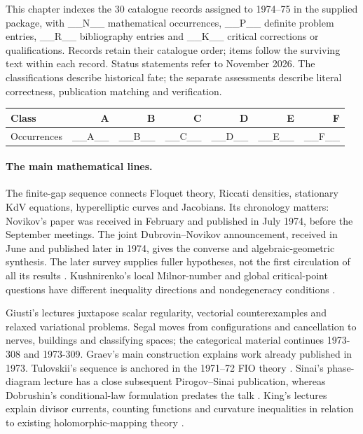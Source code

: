 \noindent
This chapter indexes the 30 catalogue records assigned to 1974--75 in the supplied
package, with __N__ mathematical occurrences, __P__ definite problem entries,
__R__ bibliography entries and __K__ critical corrections or qualifications.
Records retain their catalogue order; items follow the surviving text within
each record. Status statements refer to November 2026. The classifications
describe historical fate; the separate assessments describe literal correctness,
publication matching and verification.

\begin{center}
\begin{tabular}{@{}lrrrrrr@{}}
\toprule
Class & A & B & C & D & E & F\\
\midrule
Occurrences & __A__ & __B__ & __C__ & __D__ & __E__ & __F__\\
\bottomrule
\end{tabular}
\end{center}

\paragraph{The main mathematical lines.}
The finite-gap sequence connects Floquet theory, Riccati densities, stationary
KdV equations, hyperelliptic curves and Jacobians. Its chronology matters:
Novikov's paper was received in February and published in July 1974, before
the September meetings. The joint Dubrovin--Novikov announcement, received in
June and published later in 1974, gives the converse and algebraic-geometric
synthesis. The later survey supplies fuller hypotheses, not the first
circulation of all its results
\citep{novikov1974periodic,dubrovinnovikov1974periodicity,dubrovinmatveevnovikov1976nonlinear}.
Kushnirenko's local Milnor-number and global critical-point questions have
different inequality directions and nondegeneracy conditions
\citep[Theorems I--II]{kushnirenko1975newton}.

Giusti's lectures juxtapose scalar regularity, vectorial counterexamples and
relaxed variational problems. Segal moves from configurations and cancellation
to nerves, buildings and classifying spaces; the categorical material continues
1973-308 and 1973-309. Graev's main construction explains work already published
in 1973. Tulovskii's sequence is anchored in the 1971--72 FIO theory
\citep{hormander1971fourier,duistermaathormander1972fourierii}.
Sinai's phase-diagram lecture has a close subsequent Pirogov--Sinai publication,
whereas Dobrushin's conditional-law formulation predates the talk
\citep{pirogovsinai1975phase,dobrushin1968conditional}.
King's lectures explain divisor currents, counting functions and curvature
inequalities in relation to existing holomorphic-mapping theory
\citep{griffithsking1973nevanlinna,griffiths1971canonical}.

